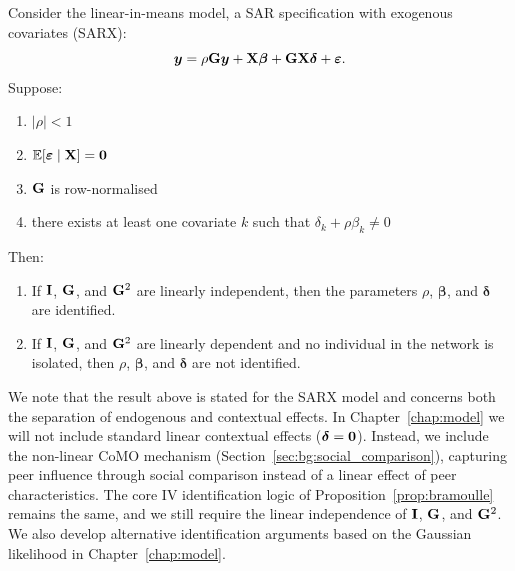 \begin{proposition}
\label{prop:bramoulle}
Consider the linear-in-means model, a SAR specification with exogenous covariates (SARX):
\begin{equation*}
    \bm{y} = \rho \mathbf{G}\bm{y} + \mathbf{X}\bm{\beta} + \mathbf{G}\mathbf{X}\bm{\delta} + \bm{\varepsilon}.
\end{equation*}
Suppose:
\begin{enumerate}
    \item[$(i)$] $|\rho| < 1$
    \item[$(ii)$] $\mathbb{E}[\bm{\varepsilon} \mid \mathbf{X}] = \bm{0}$
    \item[$(iii)$] $\mathbf{G}$ is row-normalised
    \item[$(iv)$] there exists at least one covariate $k$ such that $\delta_k + \rho\beta_k \neq 0$
\end{enumerate}
Then:
\begin{enumerate}
    \item[$(i)$] If $\mathbf{I}$, $\mathbf{G}$, and $\mathbf{G}^2$ are linearly independent, then the parameters $\rho$, $\bm{\beta}$, and $\bm{\delta}$ are identified.
    \item[$(ii)$] If $\mathbf{I}$, $\mathbf{G}$, and $\mathbf{G}^2$ are linearly dependent and no individual in the network is isolated, then $\rho$, $\bm{\beta}$, and $\bm{\delta}$ are not identified.
\end{enumerate}
\end{proposition}

\begin{remark}
We note that the result above is stated for the SARX model and concerns both the separation of endogenous and contextual effects. In Chapter~\ref{chap:model} we will not include standard linear contextual effects ($\bm{\delta} = \bm{0}$). Instead, we include the non-linear CoMO mechanism (Section~\ref{sec:bg:social_comparison}), capturing peer influence through social comparison instead of a linear effect of peer characteristics. The core IV identification logic of Proposition~\ref{prop:bramoulle} remains the same, and we still require the linear independence of $\mathbf{I}$, $\mathbf{G}$, and $\mathbf{G}^2$. We also develop alternative identification arguments based on the Gaussian likelihood in Chapter~\ref{chap:model}.
\end{remark}

